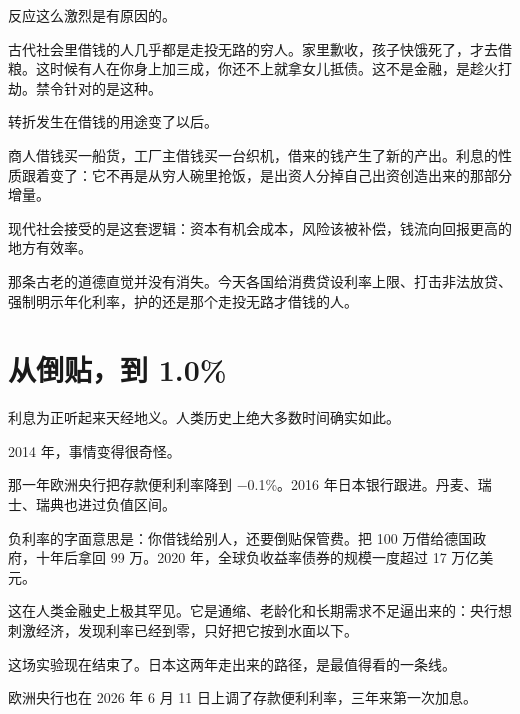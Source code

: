 反应这么激烈是有原因的。

古代社会里借钱的人几乎都是走投无路的穷人。家里歉收，孩子快饿死了，才去借粮。这时候有人在你身上加三成，你还不上就拿女儿抵债。这不是金融，是趁火打劫。禁令针对的是这种。

转折发生在借钱的用途变了以后。

商人借钱买一船货，工厂主借钱买一台织机，借来的钱产生了新的产出。利息的性质跟着变了：它不再是从穷人碗里抢饭，是出资人分掉自己出资创造出来的那部分增量。

现代社会接受的是这套逻辑：资本有机会成本，风险该被补偿，钱流向回报更高的地方有效率。

那条古老的道德直觉并没有消失。今天各国给消费贷设利率上限、打击非法放贷、强制明示年化利率，护的还是那个走投无路才借钱的人。

\section{从倒贴，到 1.0\%}

利息为正听起来天经地义。人类历史上绝大多数时间确实如此。

2014 年，事情变得很奇怪。

那一年欧洲央行把存款便利利率降到 −0.1\%。2016 年日本银行跟进。丹麦、瑞士、瑞典也进过负值区间。

负利率的字面意思是：你借钱给别人，还要倒贴保管费。把 100 万借给德国政府，十年后拿回 99 万。2020 年，全球负收益率债券的规模一度超过 17 万亿美元。

这在人类金融史上极其罕见。它是通缩、老龄化和长期需求不足逼出来的：央行想刺激经济，发现利率已经到零，只好把它按到水面以下。

这场实验现在结束了。日本这两年走出来的路径，是最值得看的一条线。

\begin{flowlist}
\end{flowlist}

欧洲央行也在 2026 年 6 月 11 日上调了存款便利利率，三年来第一次加息。

